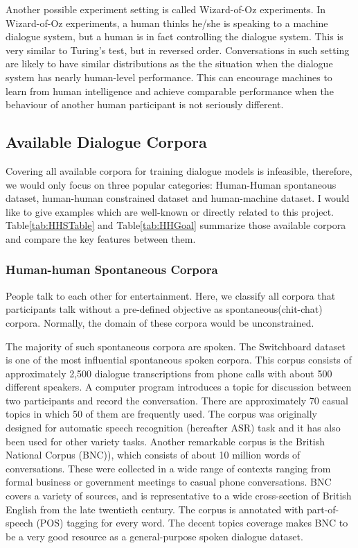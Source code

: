 \documentclass[bsc,frontabs,twoside,singlespacing,parskip,deptreport]{infthesis}     %
\begin{document}
Another possible experiment setting is called Wizard-of-Oz experiments\cite{bohus2008sorry,petrik2004wizard,budzianowski2018multiwoz,eric2019multiwoz}. In Wizard-of-Oz experiments, a human thinks he/she is speaking to a machine dialogue system, but a human is in fact controlling the dialogue system. This is very similar to Turing's test, but in reversed order. Conversations in such setting are likely to have similar distributions as the the situation when the dialogue system has nearly human-level performance. This can encourage machines to learn from human intelligence and achieve comparable performance when the behaviour of another human participant is not seriously different.  

\subsection{Available Dialogue Corpora}

Covering all available corpora for training dialogue models is infeasible, therefore, we would only focus on three popular categories: Human-Human spontaneous dataset, human-human constrained dataset and human-machine dataset. I would like to give examples which are well-known or directly related to this project. Table\ref{tab:HHSTable} and Table\ref{tab:HHGoal} summarize those available corpora and compare the key features between them.

\subsubsection*{Human-human Spontaneous Corpora}

People talk to each other for entertainment. Here, we classify all corpora that participants talk without a pre-defined objective as spontaneous(chit-chat) corpora. Normally, the domain of these corpora would be unconstrained.

The majority of such spontaneous corpora are spoken. The Switchboard dataset\cite{godfrey1992switchboard} is one of the most influential spontaneous spoken corpora. This corpus consists of approximately 2,500 dialogue transcriptions from phone calls with about 500 different speakers. A computer program introduces a topic for discussion between two participants and record the conversation. There are approximately 70 casual topics in which 50 of them are frequently used. The corpus was originally designed for automatic speech recognition (hereafter ASR) task and it has also been used for other variety tasks. Another remarkable corpus is the British National Corpus (BNC)\cite{leech1992100}), which consists of about 10 million words of conversations. These were collected in a wide range of contexts ranging from formal business or government meetings to casual phone conversations. BNC covers a variety of sources, and is representative to a wide cross-section of British English from the late twentieth century. The corpus is annotated with part-of-speech (POS) tagging for every word. The decent topics coverage makes BNC to be a very good resource as a general-purpose spoken dialogue dataset.
\end{document}
